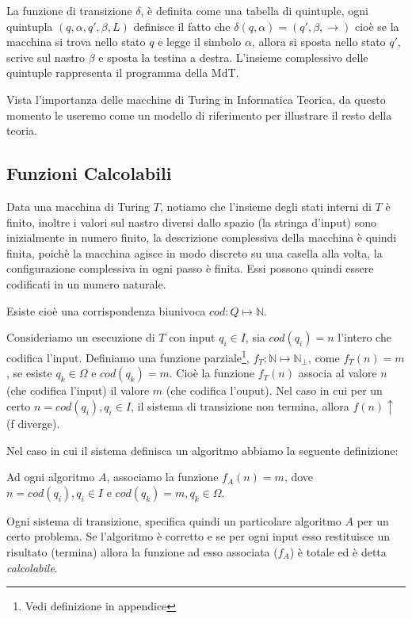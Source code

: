 La funzione di transizione $\delta$, è definita come una tabella di quintuple, ogni quintupla $(q,\alpha,q',\beta,L)$ definisce il fatto che $\delta(q,\alpha) = (q',\beta,\rightarrow)$ cioè se la macchina si trova nello stato $q$ e legge il simbolo $\alpha$, allora si sposta nello stato $q'$, scrive sul nastro $\beta$ e sposta la testina a destra. L'insieme complessivo delle quintuple rappresenta il programma della MdT.

Vista l'importanza delle macchine di Turing in Informatica Teorica, da questo momento le useremo come un modello di riferimento per illustrare il resto della teoria.

\subsection{Funzioni Calcolabili}

Data una macchina di Turing $T$, notiamo che l'insieme degli stati interni di $T$ è finito, inoltre i valori sul nastro diversi dallo spazio (la stringa d'input) sono inizialmente in numero finito, la descrizione complessiva della macchina è quindi finita, poichè la macchina agisce in modo discreto su una casella alla volta, la configurazione complessiva in ogni passo è finita. Essi possono quindi essere codificati in un numero naturale. 

Esiste cioè una corrispondenza biunivoca $cod: Q \mapsto \mathbb{N}$.

Consideriamo un esecuzione di $T$ con input $q_i \in I$, sia $cod(q_i) = n$ l'intero che codifica l'input. Definiamo una funzione parziale\footnote{Vedi definizione in appendice}, $f_T : \mathbb{N} \mapsto \mathbb{N}_\perp$, come $f_T(n) = m$, se esiste $q_k \in \Omega$ e $cod(q_k) = m$. Cioè la funzione $f_T(n)$ associa al valore $n$ (che codifica l'input) il valore $m$ (che codifica l'ouput). Nel caso in cui per un certo $n = cod(q_i), q_i \in I$, il sistema di transizione non termina, allora $f(n)\uparrow$ (f diverge).

Nel caso in cui il sistema definisca un algoritmo abbiamo la seguente definizione:

\begin{defn}
Ad ogni algoritmo $A$, associamo la funzione $f_A(n) = m$, dove $n = cod(q_i), q_i \in I$ e $cod(q_k) = m, q_k \in \Omega$.
\end{defn}


Ogni sistema di transizione, specifica quindi un particolare algoritmo $A$
per un certo problema. Se l'algoritmo è corretto e se per ogni input
esso restituisce un risultato (termina) allora la funzione ad esso associata
($f_A$) è totale ed è detta \emph{calcolabile}.


